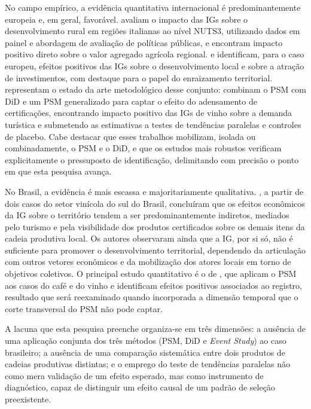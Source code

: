 \documentclass[12pt, a4paper]{article}
\begin{document}
No campo empírico, a evidência quantitativa internacional é predominantemente europeia e, em geral, favorável. \citet{cei2018} avaliam o impacto das IGs sobre o desenvolvimento rural em regiões italianas ao nível NUTS3, utilizando dados em painel e abordagem de avaliação de políticas públicas, e encontram impacto positivo direto sobre o valor agregado agrícola regional. \citet{crescenzi2022} e \citet{crescenzi2023} identificam, para o caso europeu, efeitos positivos das IGs sobre o desenvolvimento local e sobre a atração de investimentos, com destaque para o papel do enraizamento territorial. \citet{desimone2024} representam o estado da arte metodológico desse conjunto: combinam o PSM com DiD e um PSM generalizado para captar o efeito do adensamento de certificações, encontrando impacto positivo das IGs de vinho sobre a demanda turística e submetendo as estimativas a testes de tendências paralelas e controles de placebo. Cabe destacar que esses trabalhos mobilizam, isolada ou combinadamente, o PSM e o DiD, e que os estudos mais robustos verificam explicitamente o pressuposto de identificação, delimitando com precisão o ponto em que esta pesquisa avança.

No Brasil, a evidência é mais escassa e majoritariamente qualitativa. \citet{maiorki2015}, a partir de dois casos do setor vinícola do sul do Brasil, concluíram que os efeitos econômicos da IG sobre o território tendem a ser predominantemente indiretos, mediados pelo turismo e pela visibilidade dos produtos certificados sobre os demais itens da cadeia produtiva local. Os autores observaram ainda que a IG, por si só, não é suficiente para promover o desenvolvimento territorial, dependendo da articulação com outros vetores econômicos e da mobilização dos atores locais em torno de objetivos coletivos. O principal estudo quantitativo é o de \citet{medeiros2021raiher}, que aplicam o PSM aos casos do café e do vinho e identificam efeitos positivos associados ao registro, resultado que será reexaminado quando incorporada a dimensão temporal que o corte transversal do PSM não pode captar.

A lacuna que esta pesquisa preenche organiza-se em três dimensões: a ausência de uma aplicação conjunta dos três métodos (PSM, DiD e \textit{Event Study}) ao caso brasileiro; a ausência de uma comparação sistemática entre dois produtos de cadeias produtivas distintas; e o emprego do teste de tendências paralelas não como mera validação de um efeito esperado, mas como instrumento de diagnóstico, capaz de distinguir um efeito causal de um padrão de seleção preexistente.
\end{document}
